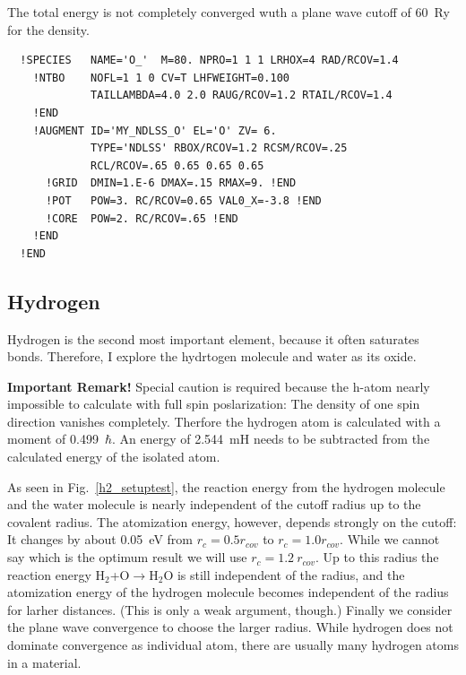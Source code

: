 \documentclass[11pt,a4paper]{report}
\begin{document}
The total energy is not completely converged wuth a plane wave cutoff
of 60~Ry for the density.


\begin{verbatim}
  !SPECIES   NAME='O_'  M=80. NPRO=1 1 1 LRHOX=4 RAD/RCOV=1.4
    !NTBO    NOFL=1 1 0 CV=T LHFWEIGHT=0.100
             TAILLAMBDA=4.0 2.0 RAUG/RCOV=1.2 RTAIL/RCOV=1.4 
    !END 
    !AUGMENT ID='MY_NDLSS_O' EL='O' ZV= 6.
             TYPE='NDLSS' RBOX/RCOV=1.2 RCSM/RCOV=.25
             RCL/RCOV=.65 0.65 0.65 0.65
      !GRID  DMIN=1.E-6 DMAX=.15 RMAX=9. !END
      !POT   POW=3. RC/RCOV=0.65 VAL0_X=-3.8 !END
      !CORE  POW=2. RC/RCOV=.65 !END
    !END
  !END
\end{verbatim}


\subsection{Hydrogen}
Hydrogen is the second most important element, because it often
saturates bonds. Therefore, I explore the hydrtogen molecule and water
as its oxide.

\textbf{Important Remark!} Special caution is required because the
h-atom nearly impossible to calculate with full spin poslarization:
The density of one spin direction vanishes completely. Therfore the
hydrogen atom is calculated with a moment of 0.499~$\hbar$. An energy
of 2.544~mH needs to be subtracted from the calculated energy of the
isolated atom.

As seen in Fig.~\ref{h2_setuptest}, the reaction energy from the
hydrogen molecule and the water molecule is nearly independent of the
cutoff radius up to the covalent radius. The atomization energy,
however, depends strongly on the cutoff: It changes by about 0.05~eV
from $r_c=0.5 r_{cov}$ to $r_c=1.0 r_{cov}$. While we cannot say which
is the optimum result we will use $r_c=1.2~r_{cov}$. Up to this radius
the reaction energy H$_2$+O$\rightarrow$H$_2$O is still independent of
the radius, and the atomization energy of the hydrogen molecule
becomes independent of the radius for larher distances. (This is only
a weak argument, though.) Finally we consider the plane wave
convergence to choose the larger radius. While hydrogen does not
dominate convergence as individual atom, there are usually many
hydrogen atoms in a material.
\end{document}
